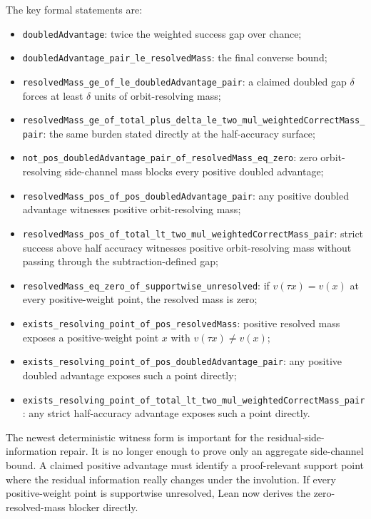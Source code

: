 \documentclass[11pt]{article}
\theoremstyle{remark}
\begin{document}
\noindent
The key formal statements are:
\begin{itemize}[leftmargin=1.5em]
  \item \texttt{doubledAdvantage}: twice the weighted success gap over chance;
  \item \texttt{doubledAdvantage\_pair\_le\_resolvedMass}: the final converse bound;
  \item \texttt{resolvedMass\_ge\_of\_le\_doubledAdvantage\_pair}: a claimed doubled gap
  \(\delta\) forces at least \(\delta\) units of orbit-resolving mass;
  \item \texttt{resolvedMass\_ge\_of\_total\_plus\_delta\_le\_two\_mul\_weightedCorrectMass\_pair}:
  the same burden stated directly at the half-accuracy surface;
  \item \texttt{not\_pos\_doubledAdvantage\_pair\_of\_resolvedMass\_eq\_zero}: zero
  orbit-resolving side-channel mass blocks every positive doubled advantage;
  \item \texttt{resolvedMass\_pos\_of\_pos\_doubledAdvantage\_pair}: any positive
  doubled advantage witnesses positive orbit-resolving mass;
  \item \texttt{resolvedMass\_pos\_of\_total\_lt\_two\_mul\_weightedCorrectMass\_pair}:
  strict success above half accuracy witnesses positive orbit-resolving mass
  without passing through the subtraction-defined gap;
  \item \texttt{resolvedMass\_eq\_zero\_of\_supportwise\_unresolved}: if \(v(\tau x)=v(x)\)
  at every positive-weight point, the resolved mass is zero;
  \item \texttt{exists\_resolving\_point\_of\_pos\_resolvedMass}: positive resolved mass
  exposes a positive-weight point \(x\) with \(v(\tau x)\ne v(x)\);
  \item \texttt{exists\_resolving\_point\_of\_pos\_doubledAdvantage\_pair}: any positive
  doubled advantage exposes such a point directly;
  \item \texttt{exists\_resolving\_point\_of\_total\_lt\_two\_mul\_weightedCorrectMass\_pair}:
  any strict half-accuracy advantage exposes such a point directly.
\end{itemize}

The newest deterministic witness form is important for the residual-side-information repair.
It is no longer enough to prove only an aggregate side-channel bound.  A claimed positive
advantage must identify a proof-relevant support point where the residual information really changes
under the involution.  If every positive-weight point is supportwise unresolved, Lean now derives the
zero-resolved-mass blocker directly.
\end{document}
